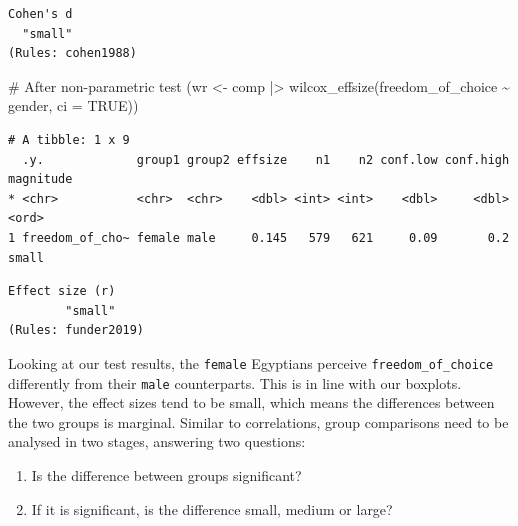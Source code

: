\documentclass[
  letterpaper,
]{krantz}
\makeatletter
\newenvironment{Shaded}{\begin{snugshade}}{\end{snugshade}}
\newcommand{\AttributeTok}[1]{\textcolor[rgb]{0.40,0.45,0.13}{#1}}
\newcommand{\CommentTok}[1]{\textcolor[rgb]{0.37,0.37,0.37}{#1}}
\newcommand{\ConstantTok}[1]{\textcolor[rgb]{0.56,0.35,0.01}{#1}}
\newcommand{\FunctionTok}[1]{\textcolor[rgb]{0.28,0.35,0.67}{#1}}
\newcommand{\NormalTok}[1]{\textcolor[rgb]{0.00,0.23,0.31}{#1}}
\newcommand{\OtherTok}[1]{\textcolor[rgb]{0.00,0.23,0.31}{#1}}
\newcommand{\SpecialCharTok}[1]{\textcolor[rgb]{0.37,0.37,0.37}{#1}}
\newenvironment{kframe}{%
\medskip{}
\setlength{\fboxsep}{.8em}
 \def\at@end@of@kframe{}%
 \ifinner\ifhmode%
  \def\at@end@of@kframe{\end{minipage}}%
  \begin{minipage}{\columnwidth}%
 \fi\fi%
 \def\FrameCommand##1{\hskip\@totalleftmargin \hskip-\fboxsep
 \colorbox{shadecolor}{##1}\hskip-\fboxsep
     \hskip-\linewidth \hskip-\@totalleftmargin \hskip\columnwidth}%
 \MakeFramed {\advance\hsize-\width
   \@totalleftmargin\z@ \linewidth\hsize
   \@setminipage}}%
 {\par\unskip\endMakeFramed%
 \at@end@of@kframe}
\renewenvironment{Shaded}{\begin{kframe}}{\end{kframe}}
\makeatother
\begin{document}
\begin{verbatim}
Cohen's d 
  "small" 
(Rules: cohen1988)
\end{verbatim}

\begin{Shaded}
\begin{Highlighting}[]
\CommentTok{\# After non{-}parametric test}
\NormalTok{(wr }\OtherTok{\textless{}{-}}
\NormalTok{    comp }\SpecialCharTok{|\textgreater{}}
    \FunctionTok{wilcox\_effsize}\NormalTok{(freedom\_of\_choice }\SpecialCharTok{\textasciitilde{}}\NormalTok{ gender,}
                   \AttributeTok{ci =} \ConstantTok{TRUE}\NormalTok{))}
\end{Highlighting}
\end{Shaded}

\begin{verbatim}
# A tibble: 1 x 9
  .y.             group1 group2 effsize    n1    n2 conf.low conf.high magnitude
* <chr>           <chr>  <chr>    <dbl> <int> <int>    <dbl>     <dbl> <ord>    
1 freedom_of_cho~ female male     0.145   579   621     0.09       0.2 small    
\end{verbatim}

\begin{Shaded}
\end{Shaded}

\begin{verbatim}
Effect size (r) 
        "small" 
(Rules: funder2019)
\end{verbatim}

Looking at our test results, the \texttt{female} Egyptians perceive
\texttt{freedom\_of\_choice} differently from their \texttt{male}
counterparts. This is in line with our boxplots. However, the effect
sizes tend to be small, which means the differences between the two
groups is marginal. Similar to correlations, group comparisons need to
be analysed in two stages, answering two questions:

\begin{enumerate}
\def\labelenumi{\arabic{enumi}.}
\item
  Is the difference between groups significant?
\item
  If it is significant, is the difference small, medium or large?
\end{enumerate}
\end{document}
